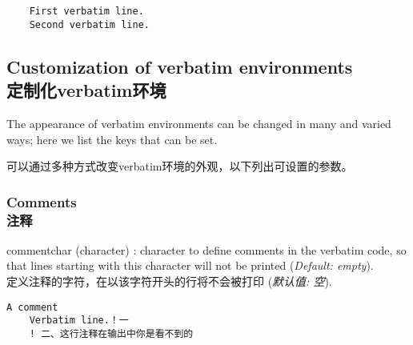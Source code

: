 \documentclass[twoside]{article}
\providecommand\optname[1]{\textsf{#1}}
\newenvironment{optlist}{\begin{description}%
  \renewcommand\makelabel[1]{%
    \descriptionlabel{\mdseries\optname{##1}}}%
  \itemsep0.25\itemsep}%
 {\end{description}}
\newcommand\verbatimTxt{抄录}
\begin{document}
\begin{SideBySideExample}
  \begin{Verbatim}
    First verbatim line.
    Second verbatim line.
  \end{Verbatim}
\end{SideBySideExample}

\subsection{Customization of verbatim environments\\定制化verbatim环境}

The appearance of verbatim environments can be changed in many and
varied ways; here we list the keys that can be set. 

可以通过多种方式改变verbatim环境的外观，以下列出可设置的参数。


\subsubsection{Comments\\注释}


\begin{optlist}
  \item[commentchar (character)]: character to define comments in the
  verbatim code, so that lines starting with this character will not be
  printed (\emph{Default: empty}).
\\定义注释的字符，在以该字符开头的行将不会被打印 (\emph{默认值: 空}).
\end{optlist}


\begin{SideBySideExample}
  \begin{Verbatim}[commentchar=!]
    A comment
    Verbatim line.！一
    ! 二、这行注释在输出中你是看不到的
  \end{Verbatim}
\end{SideBySideExample}
\end{document}
